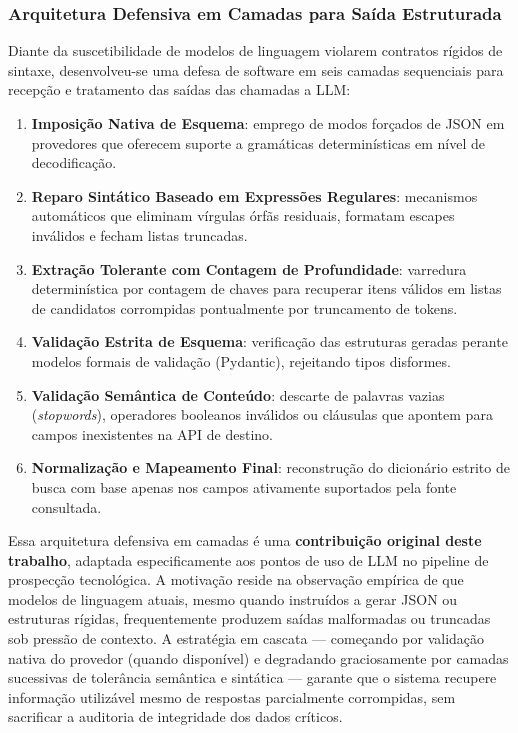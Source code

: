 \documentclass[12pt, a4paper]{article}
\begin{document}
    \subsubsection{Arquitetura Defensiva em Camadas para Saída Estruturada}
    \label{sec:defesa-camadas}

  Diante da suscetibilidade de modelos de linguagem violarem contratos rígidos de sintaxe, desenvolveu-se uma defesa de software em seis camadas sequenciais para recepção e tratamento das saídas das chamadas a LLM:
  \begin{enumerate}[label=(\alph*)]
    \item \textbf{Imposição Nativa de Esquema}: emprego de modos forçados de JSON em provedores que oferecem suporte a gramáticas determinísticas em nível de decodificação.
    \item \textbf{Reparo Sintático Baseado em Expressões Regulares}: mecanismos automáticos que eliminam vírgulas órfãs residuais, formatam escapes inválidos e fecham listas truncadas.
    \item \textbf{Extração Tolerante com Contagem de Profundidade}: varredura determinística por contagem de chaves para recuperar itens válidos em listas de candidatos corrompidas pontualmente por truncamento de tokens.
    \item \textbf{Validação Estrita de Esquema}: verificação das estruturas geradas perante modelos formais de validação (Pydantic), rejeitando tipos disformes.
    \item \textbf{Validação Semântica de Conteúdo}: descarte de palavras vazias (\textit{stopwords}), operadores booleanos inválidos ou cláusulas que apontem para campos inexistentes na API de destino.
    \item \textbf{Normalização e Mapeamento Final}: reconstrução do dicionário estrito de busca com base apenas nos campos ativamente suportados pela fonte consultada.
  \end{enumerate}

  Essa arquitetura defensiva em camadas é uma \textbf{contribuição original deste trabalho}, adaptada especificamente aos pontos de uso de LLM no pipeline de prospecção tecnológica. A motivação reside na observação empírica de que modelos de linguagem atuais, mesmo quando instruídos a gerar JSON ou estruturas rígidas, frequentemente produzem saídas malformadas ou truncadas sob pressão de contexto. A estratégia em cascata --- começando por validação nativa do provedor (quando disponível) e degradando graciosamente por camadas sucessivas de tolerância semântica e sintática --- garante que o sistema recupere informação utilizável mesmo de respostas parcialmente corrompidas, sem sacrificar a auditoria de integridade dos dados críticos.
\end{document}
